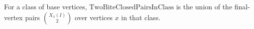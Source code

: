\begin{definition}
For a class of base vertices, \(\mathrm{TwoBiteClosedPairsInClass}\) is the
union of the final-vertex pairs \(\binom{X_x(I)}2\) over vertices \(x\) in that
class.
\end{definition}
